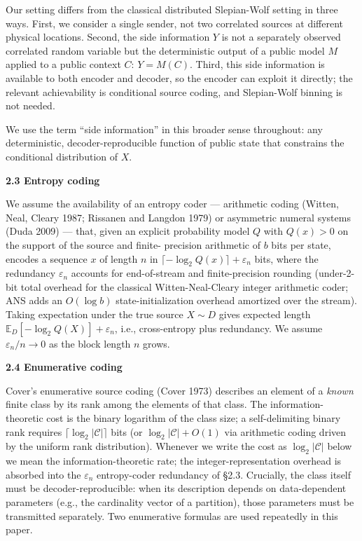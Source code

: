 \documentclass[
]{article}
\begin{document}
Our setting differs from the classical distributed Slepian-Wolf
setting in three ways. First, we consider a single sender, not two
correlated sources at different physical locations. Second, the side
information $Y$ is not a separately observed correlated random
variable but the deterministic output of a public model $M$ applied
to a public context $C$: $Y = M(C)$. Third, this side information is
available to both encoder and decoder, so the encoder can exploit it
directly; the relevant achievability is conditional source coding,
and Slepian-Wolf binning is not needed.

We use the term ``side information'' in this broader sense
throughout: any deterministic, decoder-reproducible function of
public state that constrains the conditional distribution of $X$.

\textbf{2.3 Entropy coding}

We assume the availability of an entropy coder --- arithmetic coding
(Witten, Neal, Cleary 1987; Rissanen and Langdon 1979) or asymmetric
numeral systems (Duda 2009) --- that, given an explicit probability
model $Q$ with $Q(x) > 0$ on the support of the source and finite-
precision arithmetic of $b$ bits per state, encodes a sequence $x$ of
length $n$ in $\lceil -\log_2 Q(x) \rceil + \varepsilon_n$ bits,
where the redundancy $\varepsilon_n$ accounts for end-of-stream and
finite-precision rounding (under-2-bit total overhead for the
classical Witten-Neal-Cleary integer arithmetic coder; ANS adds an
$O(\log b)$ state-initialization overhead amortized over the stream).
Taking expectation under the true source $X \sim D$ gives expected
length $\mathbb{E}_D[-\log_2 Q(X)] + \varepsilon_n$, i.e.,
cross-entropy plus redundancy. We assume $\varepsilon_n / n \to 0$
as the block length $n$ grows.

\textbf{2.4 Enumerative coding}

Cover's enumerative source coding (Cover 1973) describes an element
of a \emph{known} finite class by its rank among the elements of that
class. The information-theoretic cost is the binary logarithm of the
class size; a self-delimiting binary rank requires
$\lceil \log_2 |\mathcal{C}| \rceil$ bits (or
$\log_2 |\mathcal{C}| + O(1)$ via arithmetic coding driven by the
uniform rank distribution). Whenever we write the cost as
$\log_2 |\mathcal{C}|$ below we mean the information-theoretic rate;
the integer-representation overhead is absorbed into the
$\varepsilon_n$ entropy-coder redundancy of §2.3. Crucially, the
class itself must be decoder-reproducible: when its description
depends on data-dependent parameters (e.g., the cardinality vector
of a partition), those parameters must be transmitted separately.
Two enumerative formulas are used repeatedly in this paper.
\end{document}
